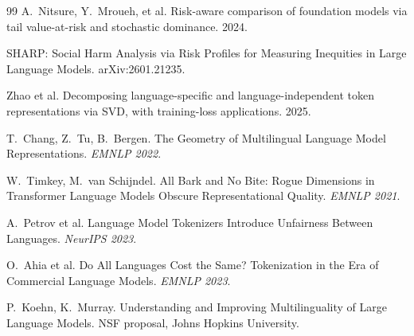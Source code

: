 \documentclass[11pt,a4paper]{article}
\begin{document}
\begin{thebibliography}{99}
A.~Nitsure, Y.~Mroueh, et al. Risk-aware comparison of foundation models via
tail value-at-risk and stochastic dominance. 2024.

SHARP: Social Harm Analysis via Risk Profiles for Measuring Inequities in
Large Language Models. arXiv:2601.21235.

Zhao et al. Decomposing language-specific and language-independent token
representations via SVD, with training-loss applications. 2025.

T.~Chang, Z.~Tu, B.~Bergen. The Geometry of Multilingual Language Model
Representations. \emph{EMNLP 2022}.

W.~Timkey, M.~van Schijndel. All Bark and No Bite: Rogue Dimensions in
Transformer Language Models Obscure Representational Quality. \emph{EMNLP 2021}.

A.~Petrov et al. Language Model Tokenizers Introduce Unfairness Between
Languages. \emph{NeurIPS 2023}.

O.~Ahia et al. Do All Languages Cost the Same? Tokenization in the Era of
Commercial Language Models. \emph{EMNLP 2023}.

P.~Koehn, K.~Murray. Understanding and Improving Multilinguality of Large
Language Models. NSF proposal, Johns Hopkins University.


\end{thebibliography}
\end{document}
